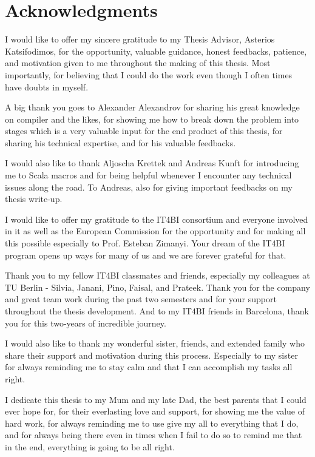 % 

\cleardoublepage

\section*{Acknowledgments}

I would like to offer my sincere gratitude to my Thesis Advisor, Asterios Katsifodimos, for the opportunity, valuable guidance, honest feedbacks, patience, and motivation given to me throughout the making of this thesis. Most importantly, for believing that I could do the work even though I often times have doubts in myself.

A big thank you goes to Alexander Alexandrov for sharing his great knowledge on compiler and the likes, for showing me how to break down the problem into stages which is a very valuable input for the end product of this thesis, for sharing his technical expertise, and for his valuable feedbacks. 

I would also like to thank Aljoscha Krettek and Andreas Kunft for introducing me to Scala macros and for being helpful whenever I encounter any technical issues along the road. To Andreas, also for giving important feedbacks on my thesis write-up. 

I would like to offer my gratitude to the IT4BI consortium and everyone involved in it as well as the European Commission for the opportunity and for making all this possible especially to Prof. Esteban Zimanyi. Your dream of the IT4BI program opens up ways for many of us and we are forever grateful for that. 

Thank you to my fellow IT4BI classmates and friends, especially my colleagues at TU Berlin - Silvia, Janani, Pino, Faisal, and Prateek. Thank you for the company and great team work during the past two semesters and for your support throughout the thesis development. And to my IT4BI friends in Barcelona, thank you for this two-years of incredible journey.  

I would also like to thank my wonderful sister, friends, and extended family who share their support and motivation during this process. Especially to my sister for always reminding me to stay calm and that I can accomplish my tasks all right. 

I dedicate this thesis to my Mum and my late Dad, the best parents that I could ever hope for, for their everlasting love and support, for showing me the value of hard work, for always reminding me to use give my all to everything that I do, and for always being there even in times when I fail to do so to remind me that in the end, everything is going to be all right. 

